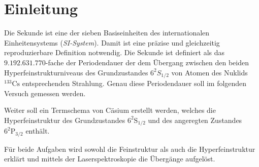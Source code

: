 \documentclass[../bericht.tex]{subfiles}
\begin{document}
  \chapter{Einleitung}

    Die Sekunde ist eine der sieben Basiseinheiten des internationalen Einheitensystems (\textit{SI-System}). Damit ist eine präzise und gleichzeitig reproduzierbare Definition notwendig. Die Sekunde ist definiert als das $9.192.631.770$-fache der Periodendauer der dem \"Ubergang zwischen den beiden Hyperfeinstrukturniveaus des Grundzustandes $6^2S_{1/2}$ von Atomen des Nuklids $\mathrm{^{133}Cs}$ entsprechenden Strahlung. Genau diese Periodendauer soll im folgenden Versuch gemessen werden.

    Weiter soll ein Termschema von C\"asium erstellt werden, welches die Hyperfeinstruktur des Grundzustandes $\mathrm{6^2S_{1/2}}$ und des angeregten Zustandes $\mathrm{6^2P_{3/2}}$ enthält.

    Für beide Aufgaben wird sowohl die Feinstruktur als auch die Hyperfeinstruktur erkl\"art und mittels der Laserspektroskopie die  \"Uberg\"ange aufgel\"ost.
\end{document}
